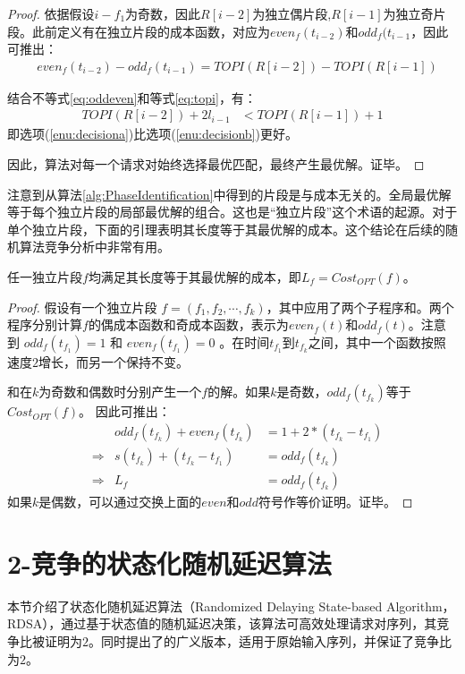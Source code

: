 \begin{proof}
依据假设$i-f_1$为奇数，因此$R[i-2]$为独立偶片段,$R[i-1]$为独立奇片段。此前定义有\TOPI 在独立片段的成本函数，对应为$even_f(t_{i-2})$和$odd_f(t_{i-1}$，因此可推出：
\begin{align}
    & even_f(t_{i-2}) - odd_f(t_{i-1})=TOPI(R[i-2]) - TOPI(R[i-1])
    \label{eq:topi}
\end{align}

结合不等式\ref{eq:oddeven}和等式\ref{eq:topi}，有：
\begin{align}
     TOPI(R[i-2]) + 2l_{i-1} &< TOPI(R[i-1]) + 1 \label{eq:topi2}
\end{align}
即选项(\ref{enu:decisiona})比选项(\ref{enu:decisionb})更好。

因此，算法\TOPI 对每一个请求对始终选择最优匹配，最终产生最优解。证毕。
\end{proof}

注意到从算法\ref{alg:PhaseIdentification}中得到的片段是与成本无关的。全局最优解等于每个独立片段的局部最优解的组合。这也是“独立片段”这个术语的起源。对于单个独立片段，下面的引理表明其长度等于其最优解的成本。这个结论在后续的随机算法竞争分析中非常有用。

\begin{lemma}
\label{lem:Phase_Length}
任一独立片段$f$均满足其长度等于其最优解的成本，即$L_f=Cost_{OPT}(f)$。
\end{lemma}
 
\begin{proof}
假设有一个独立片段 $f = (f_1, f_2, \cdots, f_k)$，其中应用了两个子程序\OPTO 和\OPTE。两个程序分别计算$f$的偶成本函数和奇成本函数，表示为$even_{f}(t)$和$odd_{f}(t)$。注意到 $odd_f(t_{f_1}) = 1$ 和 $even_f(t_{f_1}) = 0$ 。在时间$t_{f_1}$到$t_{f_k}$之间，其中一个函数按照速度$2$增长，而另一个保持不变。

\OPTO 和\OPTE 在$k$为奇数和偶数时分别产生一个$f$的解。如果$k$是奇数，$odd_f(t_{f_k})$等于$Cost_{OPT}(f)$。
因此可推出：
\begin{align*}
& & odd_f(t_{f_k}) + even_f(t_{f_k}) &= 1 + 2*(t_{f_k} - t_{f_1}) \\
& \Rightarrow & s(t_{f_k}) + (t_{f_k} - t_{f_1}) &= odd_f(t_{f_k}) \\
& \Rightarrow & L_f &= odd_f(t_{f_k})
\end{align*}
如果$k$是偶数，可以通过交换上面的$even$和$odd$符号作等价证明。证毕。
\end{proof}

\section{2-竞争的状态化随机延迟算法} \label{sec:3-ralgo}
本节介绍了状态化随机延迟算法（Randomized Delaying State-based Algorithm，\textsc{RDSA}），通过基于状态值的随机延迟决策，该算法可高效处理请求对序列，其竞争比被证明为$2$。同时提出了\ralgo 的广义版本，适用于原始输入序列，并保证了竞争比为$2$。

